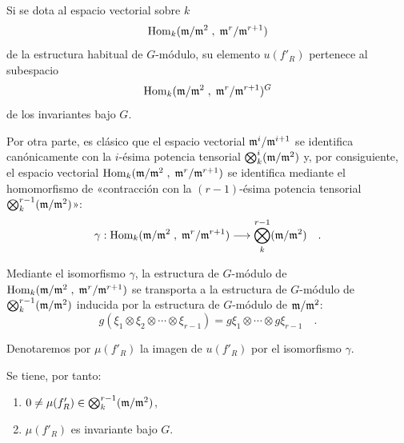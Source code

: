 Si se dota al espacio vectorial sobre $k$
\[
\operatorname{Hom}_k(\mathfrak m/\mathfrak m^2 \; , \; \mathfrak m^r/\mathfrak m^{r+1})
\]
de la estructura habitual de $G$-módulo, su elemento $u(f'_R)$ pertenece al subespacio
\[
\operatorname{Hom}_k(\mathfrak m/\mathfrak m^2 \; , \; \mathfrak m^r/\mathfrak m^{r+1})^G
\]
de los invariantes bajo $G$.

Por otra parte, es clásico que el espacio vectorial $\mathfrak m^i/\mathfrak m^{i+1}$ se identifica canónicamente con la $i$-ésima potencia tensorial $\bigotimes_k^i (\mathfrak m/\mathfrak m^2)$ y, por consiguiente, el espacio vectorial $\operatorname{Hom}_k(\mathfrak m/\mathfrak m^2 \; , \; \mathfrak m^r/\mathfrak m^{r+1})$ se identifica mediante el homomorfismo de «contracción con la $(r-1)$-ésima potencia tensorial $\bigotimes_k^{r-1}(\mathfrak m/\mathfrak m^2)$»:
\[
\gamma : \operatorname{Hom}_k(\mathfrak m/\mathfrak m^2 \; , \; \mathfrak m^r/\mathfrak m^{r+1}) \longrightarrow \bigotimes_k^{r-1}(\mathfrak m/\mathfrak m^2) \quad .
\]

Mediante el isomorfismo $\gamma$, la estructura de $G$-módulo de $\operatorname{Hom}_k(\mathfrak m/\mathfrak m^2 \; , \; \mathfrak m^r/\mathfrak m^{r+1})$ se transporta a la estructura de $G$-módulo de $\bigotimes_k^{r-1}(\mathfrak m/\mathfrak m^2)$ inducida por la estructura de $G$-módulo de $\mathfrak m/\mathfrak m^2$:
\[
g(\xi_1 \otimes \xi_2 \otimes \cdots \otimes \xi_{r-1}) = g\xi_1 \otimes \cdots \otimes g\xi_{r-1} \quad .
\]

Denotaremos por $\mu(f'_R)$ la imagen de $u(f'_R)$ por el isomorfismo $\gamma$.

Se tiene, por tanto:
\begin{enumerate}
\item[I)] $0 \neq \mu(f'_R) \in \bigotimes_k^{r-1}(\mathfrak m/\mathfrak m^2)$,
\item[II)] $\mu(f'_R)$ es invariante bajo $G$.
\end{enumerate}
